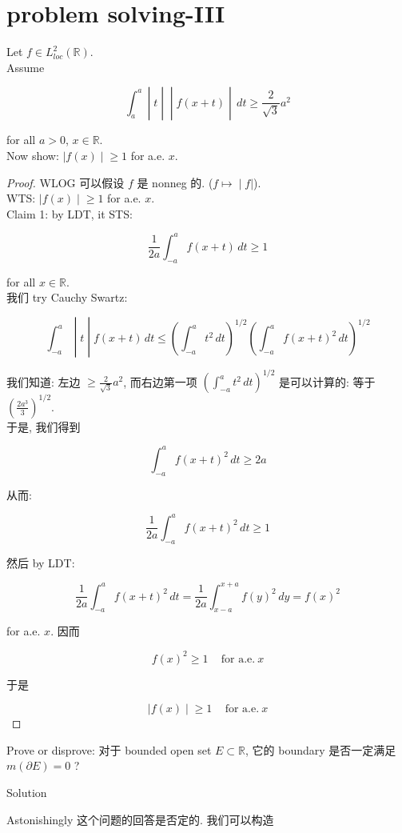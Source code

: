 \chapter{problem solving-III}\label{problem-solving-iii}

\begin{example}

Let \(f \in L_{loc}^{2}(\mathbb{R})\).\\
Assume

\[\left. \int_{a}^{a} \middle| t \middle| \middle| f(x + t) \middle| \, dt \geq \frac{2}{\sqrt{3}}a^{2} \right.\]

for all \(a > 0\), \(x \in \mathbb{R}\).\\
Now show: \(\left. |f(x) \middle| \geq 1 \right.\) for a.e. \(x\).\\

\end{example}

\begin{proof}

WLOG 可以假设 \(f\) 是 nonneg 的. (\(\left. f\mapsto \middle| f| \right.\)).\\
WTS: \(\left. |f(x) \middle| \geq 1 \right.\) for a.e. \(x\).\\
Claim 1: by LDT, it STS:

\[\frac{1}{2a}\int_{- a}^{a}f(x + t)\, dt \geq 1\]

for all \(x \in \mathbb{R}\).\\
我们 try Cauchy Swartz:

\[\left. \int_{- a}^{a} \middle| t \middle| f(x + t)\, dt \leq (\int_{- a}^{a}t^{2}\, dt)^{1/2}(\int_{- a}^{a}f(x + t)^{2}\, dt)^{1/2} \right.\]

我们知道: 左边 \(\geq \frac{2}{\sqrt{3}}a^{2}\), 而右边第一项 \((\int_{- a}^{a}t^{2}\, dt)^{1/2}\) 是可以计算的: 等于 \((\frac{2a^{3}}{3})^{1/2}\).\\
于是, 我们得到

\[\int_{- a}^{a}f(x + t)^{2}\, dt \geq 2a\]

从而:

\[\frac{1}{2a}\int_{- a}^{a}f(x + t)^{2}\, dt \geq 1\]

然后 by LDT:

\[\frac{1}{2a}\int_{- a}^{a}f(x + t)^{2}\, dt = \frac{1}{2a}\int_{x - a}^{x + a}f(y)^{2}\, dy = f(x)^{2}\]

for a.e. \(x\). 因而

\[f(x)^{2} \geq 1\,\quad\text{for a.e.}\ x\]

于是

\[\left. |f(x) \middle| \geq 1\,\quad\text{for a.e.}\ x \right.\]

\end{proof}

\begin{example}

Prove or disprove: 对于 bounded open set \(E \subset \mathbb{R}\), 它的 boundary 是否一定满足 \(m(\partial E) = 0\) ?\\

\end{example}

\begin{qlsolution}{Solution}

Astonishingly 这个问题的回答是否定的. 我们可以构造

\end{qlsolution}

